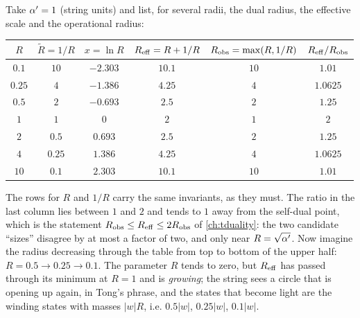\begin{example}\label{ex:dualscale:numbers}
Take $\alpha'=1$ (string units) and list, for several radii, the dual radius, the effective scale
and the operational radius:
\begin{center}
\small
\begin{tabular}{@{}cccccc@{}}
\toprule
$R$ & $\tilde R=1/R$ & $x=\ln R$ & $R_{\rm eff}=R+1/R$ & $R_{\rm obs}=\max(R,1/R)$ &
 $R_{\rm eff}/R_{\rm obs}$\\
\midrule
$0.1$ & $10$ & $-2.303$ & $10.1$ & $10$ & $1.01$\\
$0.25$ & $4$ & $-1.386$ & $4.25$ & $4$ & $1.0625$\\
$0.5$ & $2$ & $-0.693$ & $2.5$ & $2$ & $1.25$\\
$1$ & $1$ & $0$ & $2$ & $1$ & $2$\\
$2$ & $0.5$ & $0.693$ & $2.5$ & $2$ & $1.25$\\
$4$ & $0.25$ & $1.386$ & $4.25$ & $4$ & $1.0625$\\
$10$ & $0.1$ & $2.303$ & $10.1$ & $10$ & $1.01$\\
\bottomrule
\end{tabular}
\end{center}
The rows for $R$ and $1/R$ carry the same invariants, as they must. The ratio in the last
column lies between $1$ and $2$ and tends to $1$ away from the self-dual point, which is the
statement $R_{\rm obs}\le R_{\rm eff}\le2R_{\rm obs}$ of \cref{ch:tduality}: the two
candidate ``sizes'' disagree by at most a factor of two, and only near $R=\sqrt{\alpha'}$. Now
imagine the radius decreasing through the table from top to bottom of the upper half:
$R=0.5\to0.25\to0.1$. The parameter $R$ tends to zero, but $R_{\rm eff}$ has passed through
its minimum at $R=1$ and is \emph{growing}; the string sees a circle that is opening up
again, in Tong's phrase, and the states that become light are the winding states with masses
$|w|R$, i.e. $0.5|w|$, $0.25|w|$, $0.1|w|$.
\end{example}

